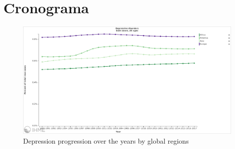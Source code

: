 \documentclass[11pt, notitlepage]{article} %
\begin{document}
\section*{Cronograma}

\appendix
\newpage
\begin{figure}
	\centering
	\includegraphics[scale=.225]{Figures/depressionprogression.png}
	\caption{Depression progression over the years by global regions} 
	\label{fig:depressionmap}
\end{figure}

% 
\end{document}
